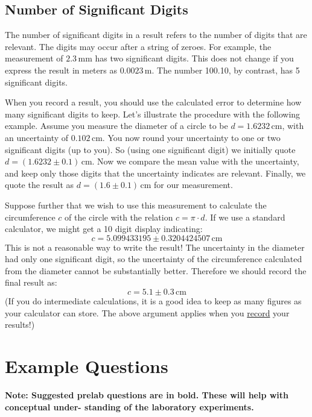 \subsection{Number of Significant Digits}

The number of significant digits in a result refers to the number of digits that are relevant. The digits may occur after a string of zeroes. For example, the measurement of $2.3\,\mathrm{mm}$ has two significant digits. This does not change if you express the result in meters as $0.0023\,\mathrm{m}$. The number 100.10, by contrast, has 5 significant digits.

When you record a result, you should use the calculated error to determine how many significant digits to keep. Let's illustrate the procedure with the following example. Assume you measure the diameter of a circle to be $d = 1.6232\,\mathrm{cm}$, with an uncertainty of $0.102\,\mathrm{cm}$. You now round your uncertainty to one or two significant digits (up to you). So (using one significant digit) we initially quote $d = (1.6232 \pm 0.1)\,\mathrm{cm}$. Now we compare the mean value with the uncertainty, and keep only those digits that the uncertainty indicates are relevant. Finally, we quote the result as $d = (1.6 \pm 0.1)\,\mathrm{cm}$ for our measurement.

Suppose further that we wish to use this measurement to calculate the circumference $c$ of the circle with the relation $c = \pi\cdot d$. If we use a standard calculator, we might get a 10 digit display indicating:
\begin{equation}
    c = 5.099433195\pm 0.3204424507\,\mathrm{cm}
\end{equation}
This is not a reasonable way to write the result!  The uncertainty in the diameter had only one significant digit, so the uncertainty of the circumference calculated from the diameter cannot be substantially better. Therefore we should record the final result as:
\begin{equation}
    c = 5.1\pm 0.3\,\mathrm{cm}
\end{equation}
(If you do intermediate calculations, it is a good idea to keep as many figures as your calculator can store. The above argument applies when you \underline{record} your results!)

\section{Example Questions}

\myskip
{\bf{Note: Suggested prelab questions are in bold. These will help with conceptual under- standing of the laboratory experiments. }}
\myskip

